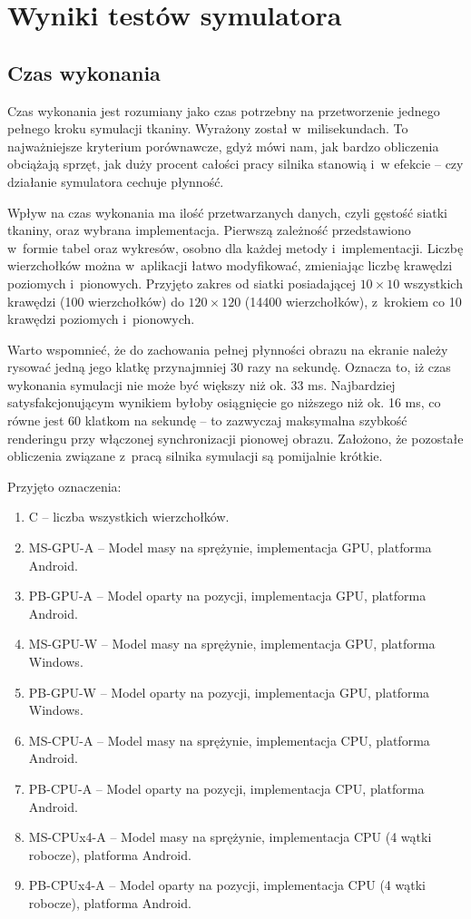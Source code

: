\chapter{Wyniki testów symulatora}
\label{t:wyniki}

	\section{Czas wykonania}
	\label{t:wyniki:czas_wykonania}

		Czas wykonania jest rozumiany jako czas potrzebny na przetworzenie jednego pełnego kroku symulacji tkaniny. Wyrażony został w~milisekundach. To najważniejsze kryterium porównawcze, gdyż mówi nam, jak bardzo obliczenia obciążają sprzęt, jak duży procent całości pracy silnika stanowią i~w efekcie -- czy działanie symulatora cechuje płynność. 
		
		Wpływ na czas wykonania ma ilość przetwarzanych danych, czyli gęstość siatki tkaniny, oraz wybrana implementacja. Pierwszą zależność przedstawiono w~formie tabel oraz wykresów, osobno dla każdej metody i~implementacji. Liczbę wierzchołków można w~aplikacji łatwo modyfikować, zmieniając liczbę krawędzi poziomych i~pionowych. Przyjęto zakres od siatki posiadającej \(10 \times 10 \) wszystkich krawędzi (100 wierzchołków) do \( 120 \times 120 \) (14400 wierzchołków), z~krokiem co 10 krawędzi poziomych i~pionowych.
		
		Warto wspomnieć, że do zachowania pełnej płynności obrazu na ekranie należy rysować jedną jego klatkę przynajmniej 30 razy na sekundę. Oznacza to, iż czas wykonania symulacji nie może być większy niż ok. 33 ms. Najbardziej satysfakcjonującym wynikiem byłoby osiągnięcie go niższego niż ok. 16 ms, co równe jest 60 klatkom na sekundę -- to zazwyczaj maksymalna szybkość renderingu przy włączonej synchronizacji pionowej obrazu. Założono, że pozostałe obliczenia związane z~pracą silnika symulacji są pomijalnie krótkie.
		
		Przyjęto oznaczenia:
		
		\begin{enumerate}
			\item C -- liczba wszystkich wierzchołków.
			\item MS-GPU-A -- Model masy na sprężynie, implementacja GPU, platforma Android.
			\item PB-GPU-A -- Model oparty na pozycji, implementacja GPU, platforma Android.
			\item MS-GPU-W -- Model masy na sprężynie, implementacja GPU, platforma Windows.
			\item PB-GPU-W -- Model oparty na pozycji, implementacja GPU, platforma Windows.
			\item MS-CPU-A -- Model masy na sprężynie, implementacja CPU, platforma Android.
			\item PB-CPU-A -- Model oparty na pozycji, implementacja CPU, platforma Android.
			\item MS-CPUx4-A -- Model masy na sprężynie, implementacja CPU (4 wątki robocze), platforma Android.
			\item PB-CPUx4-A -- Model oparty na pozycji, implementacja CPU (4 wątki robocze), platforma Android.
		\end{enumerate}
		
